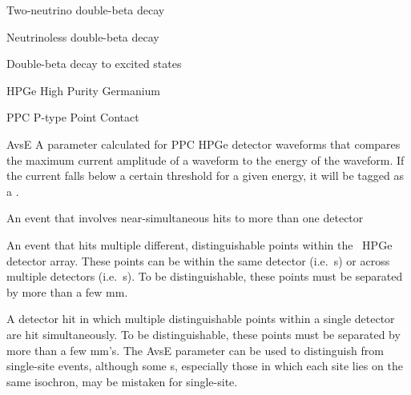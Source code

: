\begin{glossary}
\item[\tnbb] Two-neutrino double-beta decay
\item[\znbb] Neutrinoless double-beta decay
\item[\bbes] Double-beta decay to excited states
\item[HPGe] High Purity Germanium
\item[PPC] P-type Point Contact
\item[AvsE] A parameter calculated for PPC HPGe detector waveforms that compares the maximum current amplitude of a waveform to the energy of the waveform. If the current falls below a certain threshold for a given energy, it will be tagged as a \mssd.
\item[\Md] An event that involves near-simultaneous hits to more than one detector
\item[\Msmd] An event that hits multiple different, distinguishable points within the \MJD\ HPGe detector array. These points can be within the same detector (i.e.~\mssd s) or across multiple detectors (i.e.~\md s). To be distinguishable, these points must be separated by more than a few mm.
\item[\Mssd] A detector hit in which multiple distinguishable points within a single detector are hit simultaneously. To be distinguishable, these points must be separated by more than a few mm's. The AvsE parameter can be used to distinguish \mssd from single-site events, although some \mssd s, especially those in which each site lies on the same isochron, may be mistaken for single-site.
 
\end{glossary}
